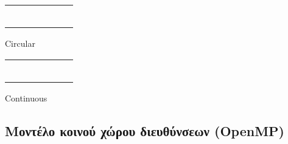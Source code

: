 \documentclass[a4paper,10pt]{article} \usepackage{anysize}
\begin{document}
\vspace{1.1em}
\begin{minipage}[t]{0.5\textwidth}
    \centering
        \begin{tabular}{| c | c | c | c | c | c | c |}
            \hline
            \rowcolor{bootblue} & & & & & & \\
            \hline
            \rowcolor{bootgreen} & & & & & & \\
            \hline
            \rowcolor{bootred} & & & & & & \\
            \hline
            \rowcolor{bootblue} & & & & & & \\
            \hline
            \rowcolor{bootgreen} & & & & & & \\
            \hline
            \rowcolor{bootred} & & & & & & \\
            \hline
            \rowcolor{bootblue} & & & & & & \\
            \hline
        \end{tabular}

        Circular
\end{minipage}
\begin{minipage}[t]{0.5\textwidth}
    \centering
        \begin{tabular}{| c | c | c | c | c | c | c |}
            \hline
            \rowcolor{bootblue} & & & & & & \\
            \hline
            \rowcolor{bootblue} & & & & & & \\
            \hline
            \rowcolor{bootblue} & & & & & & \\
            \hline
            \rowcolor{bootgreen} & & & & & & \\
            \hline
            \rowcolor{bootgreen} & & & & & & \\
            \hline
            \rowcolor{bootred} & & & & & & \\
            \hline
            \rowcolor{bootred} & & & & & & \\
            \hline
        \end{tabular}

        Continuous
\end{minipage}

\subsection{Μοντέλο κοινού χώρου διευθύνσεων (\textbf{OpenMP})}
\end{document}
